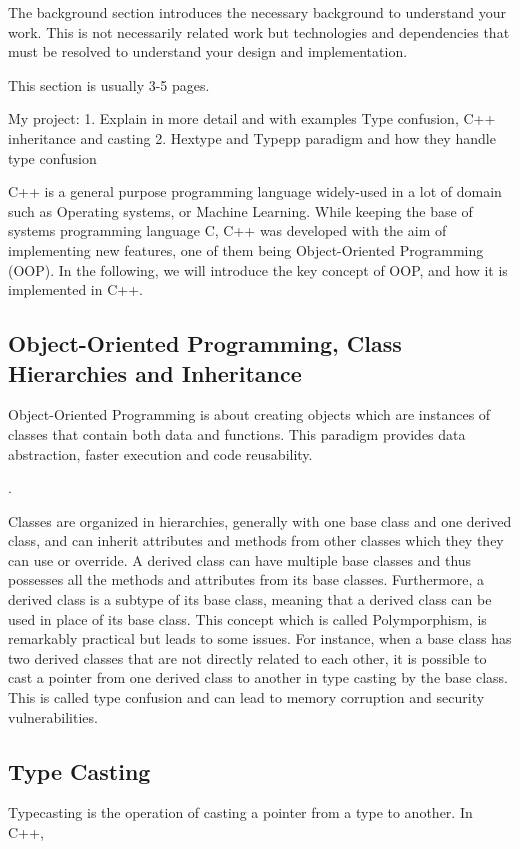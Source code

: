 \documentclass[a4paper,11pt,oneside]{report}
\begin{document}
The background section introduces the necessary background to understand your
work. This is not necessarily related work but technologies and dependencies
that must be resolved to understand your design and implementation.

This section is usually 3-5 pages.

My project:
1. Explain in more detail and with examples Type confusion, C++ inheritance and casting
2. Hextype and Typepp paradigm and how they handle type confusion

C++ is a general purpose programming language widely-used in a lot of domain such as Operating systems, 
or Machine Learning. While keeping the base of systems programming language C, C++ was developed with the aim of 
implementing new features, one of them being Object-Oriented Programming (OOP). In the following, we will introduce the key 
concept of OOP, and how it is implemented in C++. 

\subsection{Object-Oriented Programming, Class Hierarchies and Inheritance}
Object-Oriented Programming is about creating objects which are instances of classes that contain both data and functions. This paradigm provides
data abstraction, faster execution and code reusability. 

.

Classes are organized in hierarchies, generally with one base class and one derived class, and can inherit attributes and methods from other classes which they
they can use or override. A derived class can have multiple base classes and thus possesses all the methods and attributes from its base classes. 
Furthermore, a derived class is a subtype of its base class, meaning that a derived class can be used in place of its base class. This concept which is called 
Polymporphism, is remarkably practical but leads to some issues. For instance, when a base class has two derived classes that are not directly related to each other, 
it is possible to cast a pointer from one derived class to another in type casting by the base class. 
This is called type confusion and can lead to memory corruption and security vulnerabilities.

\adrbqt{}
\subsection{Type Casting}
Typecasting is the operation of casting a pointer from a type to another. In C++, 
\end{document}
